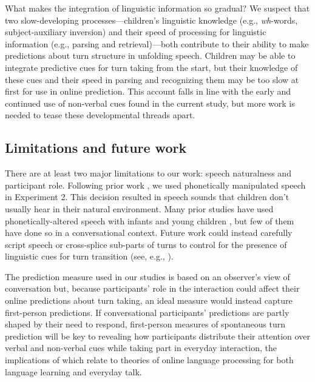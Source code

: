 \documentclass[authoryear, 12pt]{elsarticle}
\begin{document}
What makes the integration of linguistic information so gradual? We suspect that two slow-developing processes---children's linguistic knowledge (e.g., \textit{wh}-words, subject-auxiliary inversion) and their speed of processing for linguistic information (e.g., parsing and retrieval)---both contribute to their ability to make predictions about turn structure in unfolding speech. Children may be able to integrate predictive cues for turn taking from the start, but their knowledge of these cues and their speed in parsing and recognizing them may be too slow at first for use in online prediction. This account falls in line with the early and continued use of non-verbal cues  found in the current study, but more work is needed to tease these developmental threads apart.

\subsection*{Limitations and future work}

There are at least two major limitations to our work: speech naturalness and participant role. Following prior work \citep{de-ruiter2006, keitel2013}, we used phonetically manipulated speech in Experiment 2. This decision resulted in speech sounds that children don't usually hear in their natural environment. Many prior studies have used phonetically-altered speech with infants and young children \citep[cf.][]{jusczyk2000}, but few of them have done so in a conversational context. Future work could instead carefully script speech or cross-splice sub-parts of turns to control for the presence of linguistic cues for turn transition (see, e.g., \citealp{bogelstorreira2015}).

The prediction measure used in our studies is based on an observer's view of conversation but, because participants' role in the interaction could affect their online predictions about turn taking, an ideal measure would instead capture first-person predictions. If conversational participants' predictions are partly shaped by their need to respond, first-person measures of spontaneous turn prediction will be key to revealing how participants distribute their attention over verbal and non-verbal cues while taking part in everyday interaction, the implications of which relate to theories of online language processing for both language learning and everyday talk.
\end{document}
